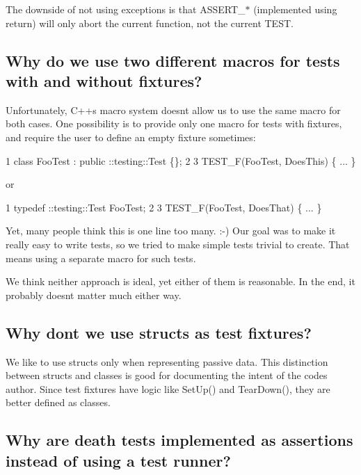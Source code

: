 The downside of not using exceptions is that {\ttfamily A\+S\+S\+E\+R\+T\+\_\+$\ast$} (implemented using {\ttfamily return}) will only abort the current function, not the current {\ttfamily T\+E\+ST}.

\subsection*{Why do we use two different macros for tests with and without fixtures?}

Unfortunately, C++\textquotesingle{}s macro system doesn\textquotesingle{}t allow us to use the same macro for both cases. One possibility is to provide only one macro for tests with fixtures, and require the user to define an empty fixture sometimes\+:


\begin{DoxyCode}
1 class FooTest : public ::testing::Test \{\};
2 
3 TEST\_F(FooTest, DoesThis) \{ ... \}
\end{DoxyCode}
 or 
\begin{DoxyCode}
1 typedef ::testing::Test FooTest;
2 
3 TEST\_F(FooTest, DoesThat) \{ ... \}
\end{DoxyCode}


Yet, many people think this is one line too many. \+:-\/) Our goal was to make it really easy to write tests, so we tried to make simple tests trivial to create. That means using a separate macro for such tests.

We think neither approach is ideal, yet either of them is reasonable. In the end, it probably doesn\textquotesingle{}t matter much either way.

\subsection*{Why don\textquotesingle{}t we use structs as test fixtures?}

We like to use structs only when representing passive data. This distinction between structs and classes is good for documenting the intent of the code\textquotesingle{}s author. Since test fixtures have logic like {\ttfamily Set\+Up()} and {\ttfamily Tear\+Down()}, they are better defined as classes.

\subsection*{Why are death tests implemented as assertions instead of using a test runner?}

